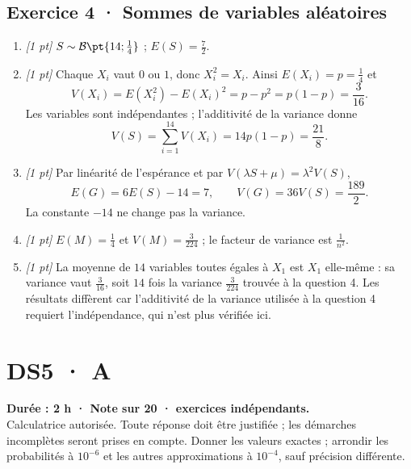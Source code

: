 \subsection*{Exercice 4 · Sommes de variables aléatoires}\begin{enumerate}

\item \textit{[1 pt]} $S\sim\mathcal B\pt{14;\frac{1}{4}}$ ; $E(S)=\frac{7}{2}$.

\item \textit{[1 pt]} Chaque $X_i$ vaut $0$ ou $1$, donc $X_i^2=X_i$. Ainsi $E(X_i)=p=\frac{1}{4}$ et
\[V(X_i)=E(X_i^2)-E(X_i)^2=p-p^2=p(1-p)=\frac{3}{16}.\]
Les variables sont indépendantes ; l'additivité de la variance donne
\[V(S)=\sum_{i=1}^{14}V(X_i)=14p(1-p)=\frac{21}{8}.\]

\item \textit{[1 pt]} Par linéarité de l'espérance et par $V(\lambda S+\mu)=\lambda^2V(S)$,
\[E(G)=6E(S)-14=7,\qquad V(G)=36V(S)=\frac{189}{2}.\]
La constante $-14$ ne change pas la variance.

\item \textit{[1 pt]} $E(M)=\frac{1}{4}$ et $V(M)=\frac{3}{224}$ ; le facteur de variance est $\frac{1}{n^2}$.

\item \textit{[1 pt]} La moyenne de $14$ variables toutes égales à $X_1$ est $X_1$ elle-même : sa variance vaut $\frac{3}{16}$, soit $14$ fois la variance $\frac{3}{224}$ trouvée à la question 4. Les résultats diffèrent car l'additivité de la variance utilisée à la question 4 requiert l'indépendance, qui n'est plus vérifiée ici.

\end{enumerate}

\fi

\ifmxteacher

\mxnewpage{}\label{sujet:7-3}

\section*{DS5 · A}


\textbf{Durée : 2 h · Note sur 20 ·  exercices indépendants.}\\Calculatrice autorisée. Toute réponse doit être justifiée ; les démarches incomplètes seront prises en compte. Donner les valeurs exactes ; arrondir les probabilités à $10^{-6}$ et les autres approximations à $10^{-4}$, sauf précision différente.

